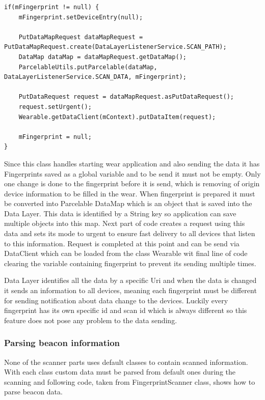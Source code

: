 \begin{lstlisting}[caption=Sending Fingerprint to Wear]
if(mFingerprint != null) {
	mFingerprint.setDeviceEntry(null);
	
	PutDataMapRequest dataMapRequest = PutDataMapRequest.create(DataLayerListenerService.SCAN_PATH);
	DataMap dataMap = dataMapRequest.getDataMap();
	ParcelableUtils.putParcelable(dataMap, DataLayerListenerService.SCAN_DATA, mFingerprint);
	
	PutDataRequest request = dataMapRequest.asPutDataRequest();
	request.setUrgent();
	Wearable.getDataClient(mContext).putDataItem(request);
	
	mFingerprint = null;
}
\end{lstlisting}

Since this class handles starting wear application and also sending the data it has Fingerprints saved as a global variable and to be send it must not be empty. Only one change is done to the fingerprint before it is send, which is removing of origin device information to be filled in the wear. When fingerprint is prepared it must be converted into Parcelable DataMap which is an object that is saved into the Data Layer. This data is identified by a String key so application can save multiple objects into this map. Next part of code creates a request using this data and sets its mode to urgent to ensure fast delivery to all devices that listen to this information. Request is completed at this point and can be send via DataClient which can be loaded from the class Wearable wit final line of code clearing the variable containing fingerprint to prevent its sending multiple times.

Data Layer identifies all the data by a specific Uri and when the data is changed it sends an information to all devices, meaning each fingerprint must be different for sending notification about data change to the devices. Luckily every fingerprint has its own specific id and scan id which is always different so this feature does not pose any problem to the data sending.

\subsubsection{Parsing beacon information}\label{subsubsec:ParsingBeaconInformation}
None of the scanner parts uses default classes to contain scanned information. With each class custom data must be parsed from default ones during the scanning and following code, taken from FingerprintScanner class, shows how to parse beacon data.


